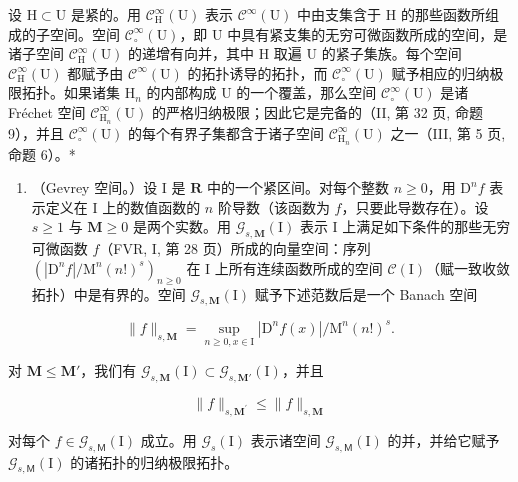 设 \(\mathrm{H} \subset \mathrm{U}\) 是紧的。用 \(\mathcal{C}_{\mathrm{H}}^{\infty}(\mathrm{U})\) 表示 \(\mathcal{C}^{\infty}(\mathrm{U})\) 中由支集含于 \(\mathrm{H}\) 的那些函数所组成的子空间。空间 \(\mathcal{C}_{\circ}^{\infty}(\mathrm{U})\)，即 \(\mathrm{U}\) 中具有紧支集的无穷可微函数所成的空间，是诸子空间 \(\mathcal{C}_{\mathrm{H}}^{\infty}(\mathrm{U})\) 的递增有向并，其中 \(\mathrm{H}\) 取遍 \(\mathrm{U}\) 的紧子集族。每个空间 \(\mathcal{C}_{\mathrm{H}}^{\infty}(\mathrm{U})\) 都赋予由 \(\mathcal{C}^{\infty}(\mathrm{U})\) 的拓扑诱导的拓扑，而 \(\mathcal{C}_{\circ}^{\infty}(\mathrm{U})\) 赋予相应的归纳极限拓扑。如果诸集 \(\mathrm{H}_n\) 的内部构成 \(\mathrm{U}\) 的一个覆盖，那么空间 \(\mathcal{C}_{\circ}^{\infty}(\mathrm{U})\) 是诸 Fréchet 空间 \(\mathcal{C}_{\mathrm{H}_n}^\infty (\mathrm{U})\) 的严格归纳极限；因此它是完备的（II, 第 32 页, 命题 9），并且 \(\mathcal{C}_{\circ}^{\infty}(\mathrm{U})\) 的每个有界子集都含于诸子空间 \(\mathcal{C}_{\mathrm{H}_n}^\infty (\mathrm{U})\) 之一（III, 第 5 页, 命题 6）。*

\begin{enumerate}
\def\labelenumi{\alph{enumi})}
\setcounter{enumi}{2}
\tightlist
\item
  （Gevrey 空间。）设 I 是 \(\mathbf{R}\) 中的一个紧区间。对每个整数 \(n \geqslant 0\)，用 \(\mathrm{D}^n f\) 表示定义在 I 上的数值函数的 \(n\) 阶导数（该函数为 \(f\)，只要此导数存在）。设 \(s \geqslant 1\) 与 \(\mathbf{M} \geqslant 0\) 是两个实数。用 \(\mathcal{G}_{s,\mathbf{M}}(\mathrm{I})\) 表示 I 上满足如下条件的那些无穷可微函数 \(f\)（FVR, I, 第 28 页）所成的向量空间：序列 \((|\mathrm{D}^n f| / \mathrm{M}^n (n!)^s)_{n \geqslant 0}\) 在 I 上所有连续函数所成的空间 \(\mathcal{C}(\mathrm{I})\)（赋一致收敛拓扑）中是有界的。空间 \(\mathcal{G}_{s,\mathbf{M}}(\mathrm{I})\) 赋予下述范数后是一个 Banach 空间
\end{enumerate}

\[
\| f \| _ {s, \mathbf {M}} = \sup _ {n \geqslant 0, x \in \mathrm{I}} | \mathrm{D} ^ {n} f (x) | / \mathrm{M} ^ {n} (n!) ^ {s}.
\]

对 \(\mathbf{M} \leqslant \mathbf{M}'\)，我们有 \(\mathcal{G}_{s,\mathbf{M}}(\mathrm{I}) \subset \mathcal{G}_{s,\mathbf{M}'}(\mathrm{I})\)，并且

\[
\| f \| _ {s, \mathbf {M} ^ {\prime}} \leqslant \| f \| _ {s, \mathbf {M}}
\]

对每个 \(f \in \mathcal{G}_{s,\mathsf{M}}(\mathrm{I})\) 成立。用 \(\mathcal{G}_s(\mathrm{I})\) 表示诸空间 \(\mathcal{G}_{s,\mathsf{M}}(\mathrm{I})\) 的并，并给它赋予 \(\mathcal{G}_{s,\mathsf{M}}(\mathrm{I})\) 的诸拓扑的归纳极限拓扑。

